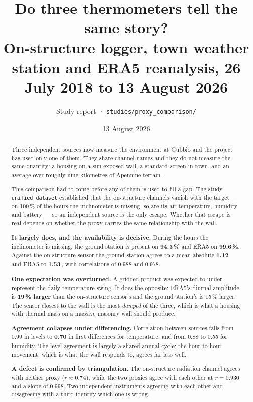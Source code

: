 \documentclass[11pt,a4paper]{article}
\title{\vspace{-1.2cm}\textbf{Do three thermometers tell the same story?}\\[2mm]
\large On-structure logger, town weather station and ERA5 reanalysis,
26 July 2018 to 13 August 2026}
\author{Study report · \texttt{studies/proxy\_comparison/}}
\date{13 August 2026}
\begin{document}
\maketitle
\thispagestyle{fancy}

\begin{abstract}
\noindent
Three independent sources now measure the environment at Gubbio and the project
has used only one of them. They share channel names and they do not measure the
same quantity: a housing on a sun-exposed wall, a standard screen in town, and an
average over roughly nine kilometres of Apennine terrain.

This comparison had to come before any of them is used to fill a gap. The
study \texttt{unified\_dataset} established that the on-structure channels
vanish with the target --- on 100\,\% of the hours the inclinometer is missing,
so are its air temperature, humidity and battery --- so an independent source is
the only escape. Whether that escape is real depends on whether the proxy carries
the same relationship with the wall.

\textbf{It largely does, and the availability is decisive.} During the hours the
inclinometer is missing, the ground station is present on \textbf{94.3\,\%} and
ERA5 on \textbf{99.6\,\%}. Against the on-structure sensor the ground station
agrees to a mean absolute \textbf{1.12\,\degC} and ERA5 to \textbf{1.53\,\degC},
with correlations of 0.988 and 0.978.

\textbf{One expectation was overturned.} A gridded product was expected to
under-represent the daily temperature swing. It does the opposite: ERA5's diurnal
amplitude is \textbf{19\,\% larger} than the on-structure sensor's and the ground
station's is 15\,\% larger. The sensor closest to the wall is the most
\emph{damped} of the three, which is what a housing with thermal mass on a
massive masonry wall should produce.

\textbf{Agreement collapses under differencing.} Correlation between sources
falls from 0.99 in levels to \textbf{0.70} in first differences for temperature,
and from 0.88 to 0.55 for humidity. The level agreement is largely a shared
annual cycle; the hour-to-hour movement, which is what the wall responds to,
agrees far less well.

\textbf{A defect is confirmed by triangulation.} The on-structure radiation
channel agrees with neither proxy ($r \approx 0.74$), while the two proxies agree
with each other at $r = 0.930$ and a slope of 0.998. Two independent instruments
agreeing with each other and disagreeing with a third identify which one is
wrong.


\end{abstract}
\end{document}
